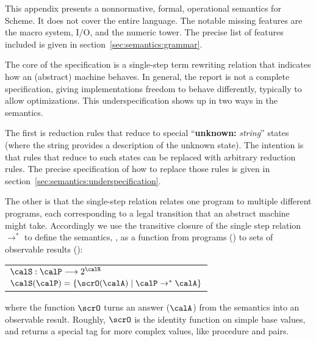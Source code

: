 

This appendix presents a nonnormative, formal, operational semantics for Scheme. It does not cover the entire language. The notable missing features are the macro system, I/O, and the numeric tower. The precise list of features included is given in section~\ref{sec:semantics:grammar}.

The core of the specification is a single-step term rewriting relation that indicates how an (abstract) machine behaves. In general, the report is not a complete specification, giving implementations freedom to behave differently, typically to allow optimizations. This underspecification shows up in two ways in the semantics. 

The first is reduction rules that reduce to special ``\textbf{unknown:} \textit{string}'' states (where the string provides a description of the unknown state). The intention is that rules that reduce to such states can be replaced with arbitrary reduction rules. The precise specification of how to replace those rules is given in section~\ref{sec:semantics:underspecification}.

The other is that the single-step relation relates one program to
multiple different programs, each corresponding to a legal transition
that an abstract machine might take. Accordingly we use the transitive
closure of the single step relation $\rightarrow^*$ to define the
semantics, \calS, as a function from programs (\calP)
to sets of observable results (\calR):
\begin{center}
\begin{tabular}{l}
$\calS : \calP \longrightarrow 2^{\calR}$ \\
$\calS(\calP) = \{ \scrO(\calA) \mid \calP \rightarrow^* \calA \}$
\end{tabular}
\end{center}
where the function $\scrO$ turns an answer ($\calA$) from the semantics into an observable result. Roughly, $\scrO$ is the identity function on simple base values, and returns a special tag for more complex values, like procedure and pairs.

